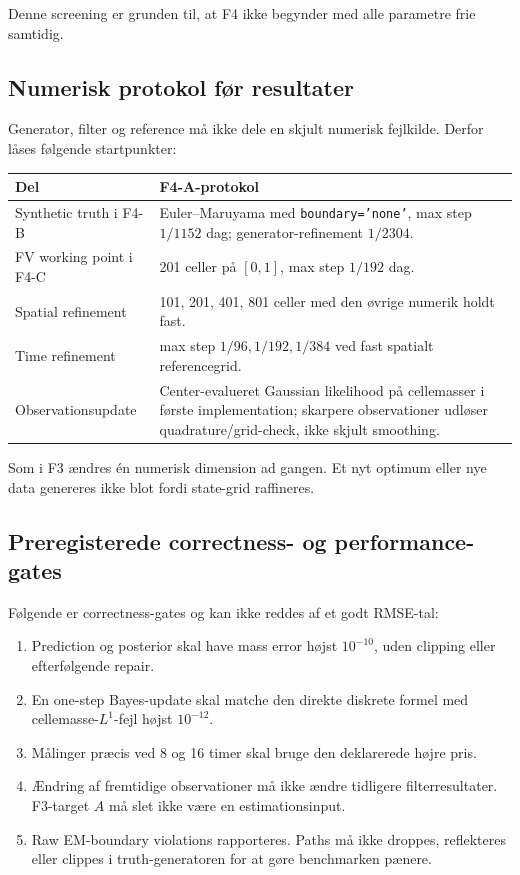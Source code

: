 Denne screening er grunden til, at F4 ikke begynder med alle parametre frie samtidig.

\subsection{Numerisk protokol før resultater}

Generator, filter og reference må ikke dele en skjult numerisk fejlkilde. Derfor låses
følgende startpunkter:

\begin{center}
\begin{tabularx}{\linewidth}{@{}lX@{}}
\toprule
Del & F4-A-protokol\\
\midrule
Synthetic truth i F4-B &
Euler--Maruyama med \texttt{boundary='none'}, max step \(1/1152\) dag;
generator-refinement \(1/2304\).\\
FV working point i F4-C &
201 celler på \([0,1]\), max step \(1/192\) dag.\\
Spatial refinement &
101, 201, 401, 801 celler med den øvrige numerik holdt fast.\\
Time refinement &
max step \(1/96,1/192,1/384\) ved fast spatialt referencegrid.\\
Observationsupdate &
Center-evalueret Gaussian likelihood på cellemasser i første implementation;
skarpere observationer udløser quadrature/grid-check, ikke skjult smoothing.\\
\bottomrule
\end{tabularx}
\end{center}

Som i F3 ændres én numerisk dimension ad gangen. Et nyt optimum eller nye data
genereres ikke blot fordi state-grid raffineres.

\subsection{Preregisterede correctness- og performance-gates}

Følgende er correctness-gates og kan ikke reddes af et godt RMSE-tal:
\begin{enumerate}
\item Prediction og posterior skal have mass error højst \(10^{-10}\), uden clipping
eller efterfølgende repair.
\item En one-step Bayes-update skal matche den direkte diskrete formel med
cellemasse-\(L^1\)-fejl højst \(10^{-12}\).
\item Målinger præcis ved 8 og 16 timer skal bruge den deklarerede højre pris.
\item Ændring af fremtidige observationer må ikke ændre tidligere filterresultater.
F3-target \(A\) må slet ikke være en estimationsinput.
\item Raw EM-boundary violations rapporteres. Paths må ikke droppes, reflekteres eller
clippes i truth-generatoren for at gøre benchmarken pænere.
\end{enumerate}

